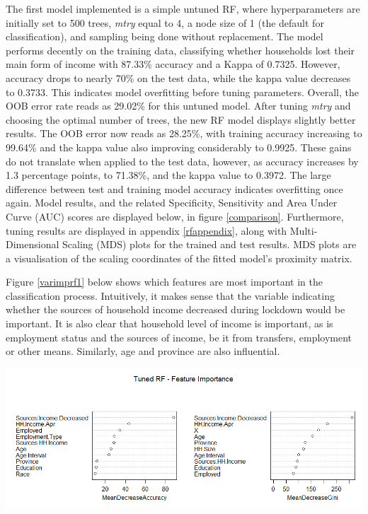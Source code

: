 \documentclass[11pt,preprint, authoryear]{elsarticle}
\let\origfigure\figure
\let\endorigfigure\endfigure
\renewenvironment{figure}[1][2] {
    \expandafter\origfigure\expandafter[H]
} {
    \endorigfigure
}
\numberwithin{equation}{section}
\numberwithin{figure}{section}
\numberwithin{table}{section}
\begin{document}
The first model implemented is a simple untuned RF, where
hyperparameters are initially set to 500 trees, \emph{mtry} equal to 4,
a node size of 1 (the default for classification), and sampling being
done without replacement. The model performs decently on the training
data, classifying whether households lost their main form of income with
87.33\% accuracy and a Kappa of 0.7325. However, accuracy drops to
nearly 70\% on the test data, while the kappa value decreases to 0.3733.
This indicates model overfitting before tuning parameters. Overall, the
OOB error rate reads as 29.02\% for this untuned model. After tuning
\emph{mtry} and choosing the optimal number of trees, the new RF model
displays slightly better results. The OOB error now reads as 28.25\%,
with training accuracy increasing to 99.64\% and the kappa value also
improving considerably to 0.9925. These gains do not translate when
applied to the test data, however, as accuracy increases by 1.3
percentage points, to 71.38\%, and the kappa value to 0.3972. The large
difference between test and training model accuracy indicates
overfitting once again. Model results, and the related Specificity,
Sensitivity and Area Under Curve (AUC) scores are displayed below, in
figure \ref{comparison}. Furthermore, tuning results are displayed in
appendix \ref{rfappendix}, along with Multi-Dimensional Scaling (MDS)
plots for the trained and test results. MDS plots are a visualisation of
the scaling coordinates of the fitted model's proximity matrix.

Figure \ref{varimprf1} below shows which features are most important in
the classification process. Intuitively, it makes sense that the
variable indicating whether the sources of household income decreased
during lockdown would be important. It is also clear that household
level of income is important, as is employment status and the sources of
income, be it from transfers, employment or other means. Similarly, age
and province are also influential.

\begin{figure}[H]
\includegraphics[width=1\linewidth]{Figures/rf3_impplot} \caption{\label{varimprf1} RF Feature Importance}\label{fig:varimprf1}
\end{figure}
\end{document}
